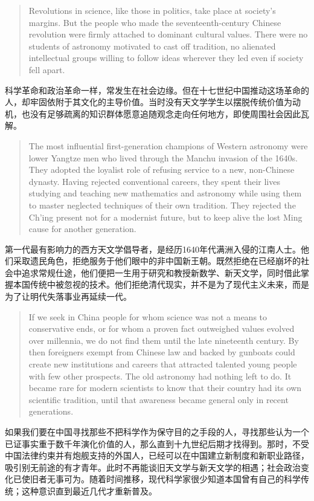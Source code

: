 \documentclass[UTF8,zihao=-4]{ctexart}
\newenvironment{enblock}
  {\par\smallskip\noindent{\scriptsize\bfseries English}\par\begin{quote}\small}
  {\end{quote}}
\newenvironment{zhblock}
  {\par\noindent{\scriptsize\bfseries 中文}\par}
  {\par\medskip}
\begin{document}
\begin{enblock}
Revolutions in science, like those in politics, take place at society's margins. But the people who made the seventeenth-century Chinese revolution were firmly attached to dominant cultural values. There were no students of astronomy motivated to cast off tradition, no alienated intellectual groups willing to follow ideas wherever they led even if society fell apart.
\end{enblock}
\begin{zhblock}
科学革命和政治革命一样，常发生在社会边缘。但在十七世纪中国推动这场革命的人，却牢固依附于其文化的主导价值。当时没有天文学学生以摆脱传统价值为动机，也没有足够疏离的知识群体愿意追随观念走向任何地方，即使周围社会因此瓦解。
\end{zhblock}

\begin{enblock}
The most influential first-generation champions of Western astronomy were lower Yangtze men who lived through the Manchu invasion of the 1640s. They adopted the loyalist role of refusing service to a new, non-Chinese dynasty. Having rejected conventional careers, they spent their lives studying and teaching new mathematics and astronomy while using them to master neglected techniques of their own tradition. They rejected the Ch'ing present not for a modernist future, but to keep alive the lost Ming cause for another generation.
\end{enblock}
\begin{zhblock}
第一代最有影响力的西方天文学倡导者，是经历1640年代满洲入侵的江南人士。他们采取遗民角色，拒绝服务于他们眼中的非中国新王朝。既然拒绝在已经崩坏的社会中追求常规仕途，他们便把一生用于研究和教授新数学、新天文学，同时借此掌握本国传统中被忽视的技术。他们拒绝清代现实，并不是为了现代主义未来，而是为了让明代失落事业再延续一代。
\end{zhblock}

\begin{enblock}
If we seek in China people for whom science was not a means to conservative ends, or for whom a proven fact outweighed values evolved over millennia, we do not find them until the late nineteenth century. By then foreigners exempt from Chinese law and backed by gunboats could create new institutions and careers that attracted talented young people with few other prospects. The old astronomy had nothing left to do. It became rare for modern scientists to know that their country had its own scientific tradition, until that awareness became general only in recent generations.
\end{enblock}
\begin{zhblock}
如果我们要在中国寻找那些不把科学作为保守目的之手段的人，寻找那些认为一个已证事实重于数千年演化价值的人，那么直到十九世纪后期才找得到。那时，不受中国法律约束并有炮舰支持的外国人，已经可以在中国建立新制度和新职业路径，吸引别无前途的有才青年。此时不再能谈旧天文学与新天文学的相遇；社会政治变化已使旧者无事可为。随着时间推移，现代科学家很少知道本国曾有自己的科学传统；这种意识直到最近几代才重新普及。
\end{zhblock}
\end{document}
